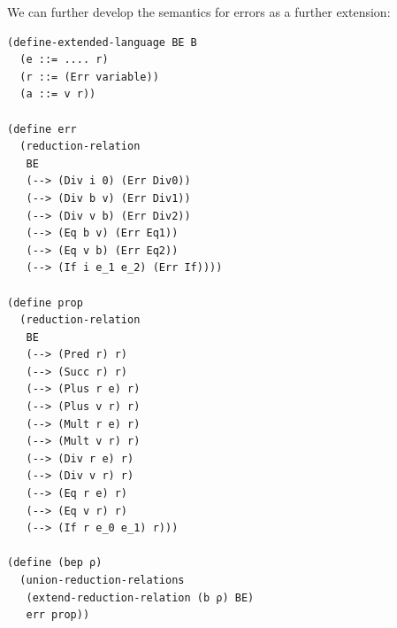 We can further develop the semantics for errors as a further
extension:
\begin{verbatim}
(define-extended-language BE B
  (e ::= .... r)
  (r ::= (Err variable))
  (a ::= v r))
 
(define err
  (reduction-relation 
   BE
   (--> (Div i 0) (Err Div0))
   (--> (Div b v) (Err Div1))
   (--> (Div v b) (Err Div2))
   (--> (Eq b v) (Err Eq1))
   (--> (Eq v b) (Err Eq2))
   (--> (If i e_1 e_2) (Err If))))

(define prop
  (reduction-relation
   BE
   (--> (Pred r) r)
   (--> (Succ r) r)
   (--> (Plus r e) r)
   (--> (Plus v r) r)
   (--> (Mult r e) r)
   (--> (Mult v r) r)
   (--> (Div r e) r)
   (--> (Div v r) r)    
   (--> (Eq r e) r)
   (--> (Eq v r) r)
   (--> (If r e_0 e_1) r)))

(define (bep ρ)
  (union-reduction-relations 
   (extend-reduction-relation (b ρ) BE)
   err prop))
\end{verbatim}
